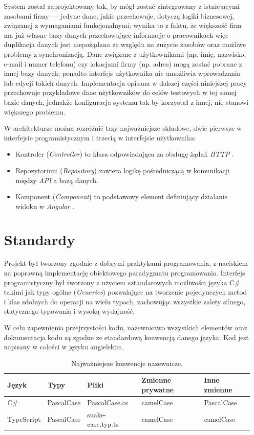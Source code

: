 \documentclass[eng,printmode,openany]{mgr}
\begin{document}
	
	System został zaprojektowany tak, by mógł zostać zintegrowany z istniejącymi zasobami firmy — jedyne dane, jakie przechowuje, dotyczą logiki biznesowej, związanej z wymaganiami funkcjonalnymi; wynika to z faktu, że większość firm ma już własne bazy danych przechowujące informacje o pracownikach więc duplikacja danych jest niepożądana ze względu na zużycie zasobów oraz możliwe problemy z synchronizacją. Dane związane z użytkownikami (np. imię, nazwisko, e-mail i numer telefonu) czy lokacjami firmy (np. adres) mogą zostać pobrane z innej bazy danych; ponadto interfejs użytkownika nie umożliwia wprowadzania lub edycji takich danych. Implementacja opisana w dalszej części niniejszej pracy przechowuje przykładowe dane użytkowników do celów testowych w tej samej bazie danych, jednakże konfiguracja systemu tak by korzystał z innej, nie stanowi większego problemu.
	
	W architekturze można rozróżnić trzy najważniejsze składowe, dwie pierwsze w interfejsie programistycznym i trzecią w interfejsie użytkownika:
	\begin{itemize}
		\item Kontroler (\textit{Controller}) to klasa odpowiadająca za obsługę żądań \textit{HTTP} \cite{msdn-aspnet-api}.
		\item Repozytorium (\textit{Repository}) zawiera logikę pośredniczącą w komunikacji między \textit{API} a bazą danych.
		\item Komponent (\textit{Component}) to podstawowy element definiujący działanie widoku w \textit{Angular} \cite{angular-components}.
	\end{itemize}
	
	\section{Standardy}
	Projekt był tworzony zgodnie z dobrymi praktykami programowania, z naciskiem na poprawną implementację obiektowego paradygmatu programowania. Interfejs programistyczny był tworzony z użyciem sztandarowych możliwości języka C\# takimi jak typy ogólne \cite{msdn-generics} (\textit{Generics}) pozwalające na tworzenie pojedynczych metod i klas zdolnych do operacji na wielu typach, zachowując wszystkie zalety silnego, statycznego typowania i wysoką wydajność.
	
	W celu zapewnienia przejrzystości kodu, nazewnictwo wszystkich elementów oraz dokumentacja kodu są zgodne ze standardową konwencją danego języka. Kod jest napisany w całości w języku angielskim.
	\begin{table}[H]
		\begin{tabularx}{\textwidth}{|l|l|l|l|X|}
			\hline
			Język      & Typy       			& Pliki                 & Zmienne prywatne & Inne zmienne \\ \hline
			C\# \cite{msdn-gnc}     & PascalCase & PascalCase.cs   		& camelCase        & PascalCase   \\ \hline
			TypeScript \cite{angular-sg} & PascalCase & snake-case.typ.ts 	& camelCase        & camelCase    \\ \hline
		\end{tabularx}
		\caption{Najważniejsze konwencje nazewnicze.}
	\end{table}
	
\end{document}
